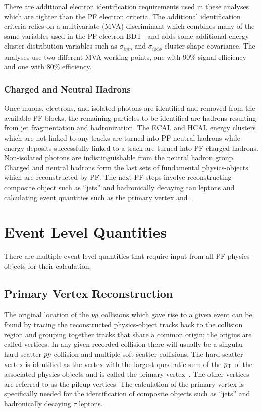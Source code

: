 There are additional electron identification requirements used in these analyses which are tighter
than the PF electron criteria. The additional identification criteria relies on a multivariate (MVA) discriminant
which combines many of the same variables used in the PF electron BDT~\cite{Khachatryan:2015hwa} 
and adds some additional energy cluster distribution variables such as $\sigma_{i\eta i\eta}$ and
$\sigma_{i\phi i\phi}$ cluster shape covariance. The analyses use
two different MVA working points, one with 90\% signal efficiency and one with 80\% efficiency.


\subsubsection{Charged and Neutral Hadrons}
Once muons, electrons, and isolated photons are identified and removed from the available PF blocks, 
the remaining particles to be identified are hadrons resulting from jet fragmentation and 
hadronization. The ECAL and HCAL energy clusters which are not linked to any tracks are turned into
PF neutral hadrons while energy deposits successfully linked to a track are turned into PF charged
hadrons. Non-isolated photons are indistinguishable from the neutral hadron group.
Charged and neutral hadrons form the last sets of fundamental physics-objects
which are reconstructed by PF. The next PF steps involve reconstructing composite object such as ``jets''
and hadronically decaying tau leptons and calculating event quantities such as the primary vertex and
\etvecmiss.


\section{Event Level Quantities}
There are multiple event level quantities that require input from all PF physics-objects for their
calculation.


\subsection{Primary Vertex Reconstruction}
The original location of the $pp$ collisions which gave rise to a given event can be found by tracing
the reconstructed physics-object tracks back to the collision region and grouping together tracks that share a common
origin; the origins are called vertices. In any given recorded collision there will usually be a 
singular hard-scatter $pp$ collision and multiple soft-scatter collisions. The hard-scatter vertex is 
identified as the vertex with the largest quadratic sum of the $p_\mathrm{T}$ of the associated physics-objects 
and is called the primary vertex~\cite{Sirunyan:2017ulk}. The other vertices are referred to as the
pileup vertices. The calculation of the primary vertex is specifically needed for the identification of
composite objects such as ``jets'' and hadronically decaying $\tau$ leptons.


